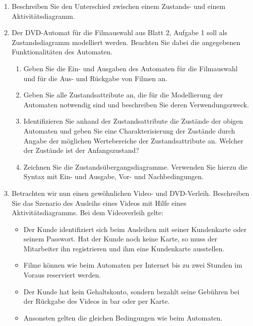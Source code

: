 \documentclass{lehramt-informatik}
\begin{document}
\begin{enumerate}
\item Beschreiben Sie den Unterschied zwischen einem Zustands- und einem
Aktivitätsdiagramm.

\item Der DVD-Automat für die Filmauswahl aus Blatt 2, Aufgabe 1 soll
als Zustandsdiagramm modelliert werden. Beachten Sie dabei die
angegebenen Funktionalitäten des Automaten.

\begin{enumerate}
\item Geben Sie die Ein- und Ausgaben des Automaten für die Filmauswahl
und für die Aus- und Rückgabe von Filmen an.

\item Geben Sie alle Zustandsattribute an, die für die Modellierung der
Automaten notwendig sind und beschreiben Sie deren Verwendungszweck.

\item Identifizieren Sie anhand der Zustandsattribute die Zustände der
obigen Automaten und geben Sie eine Charakterisierung der Zustände durch
Angabe der möglichen Wertebereiche der Zustandsattribute an. Welcher der
Zustände ist der Anfangszustand?

\item Zeichnen Sie die Zustandsübergangsdiagramme. Verwenden Sie hierzu
die Syntax mit Ein- und Ausgabe, Vor- und Nachbedingungen.
\end{enumerate}

\item Betrachten wir nun einen gewöhnlichen Video- und DVD-Verleih.
Beschreiben Sie das Szenario des Ausleihs eines Videos mit Hilfe eines
Aktivitätsdiagramms. Bei dem Videoverleih gelte:

\begin{itemize}
\item Der Kunde identifiziert sich beim Ausleihen mit seiner Kundenkarte
oder seinem Passwort. Hat der Kunde noch keine Karte, so muss der
Mitarbeiter ihn registrieren und ihm eine Kundenkarte ausstellen.

\item Filme können wie beim Automaten per Internet bis zu zwei Stunden
im Voraus reserviert werden.

\item Der Kunde hat kein Gehaltskonto, sondern bezahlt seine Gebühren
bei der Rückgabe des Videos in bar oder per Karte.

\item Ansonsten gelten die gleichen Bedingungen wie beim Automaten.
\end{itemize}
\end{enumerate}
\end{document}
